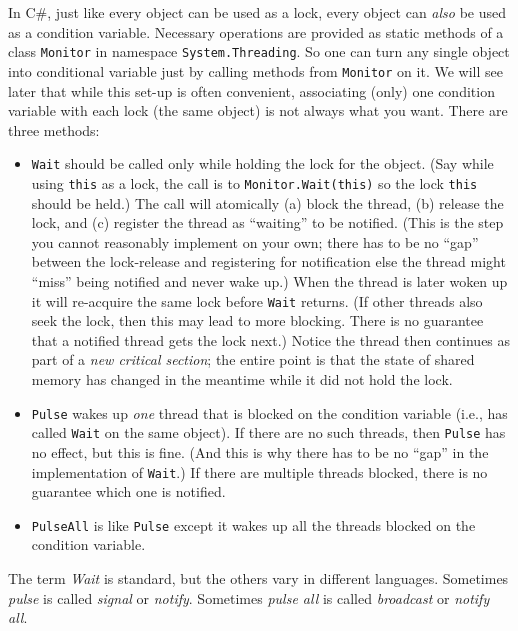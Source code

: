 \documentclass[10pt]{article}
\begin{document}
In C\#, just like every object can be used as a lock, every object 
can \emph{also} be used as a condition variable. Necessary operations are 
provided as static methods of a class {\tt Monitor} in namespace {\tt System.Threading}. 
So one can turn any single object into conditional variable just by 
calling methods from {\tt Monitor} on it. We will see later that while this
set-up is often convenient, associating (only) one condition variable
with each lock (the same object) is not always what you want.  There
are three methods:
\begin{itemize}
\item {\tt Wait} should be called only while holding the lock for the
  object.  (Say while using {\tt this} as a lock, the call is to 
  {\tt Monitor.Wait(this)} so the lock {\tt this} should be held.) 
  The call will atomically (a) block the thread,
  (b) release the lock, and (c) register the thread as
  ``waiting'' to be notified.  (This is the step you cannot reasonably
  implement on your own; there has to be no ``gap'' between the
  lock-release and registering for notification else the thread might ``miss''
  being notified and never wake up.)  When the thread is later woken
  up it will re-acquire the same lock before {\tt Wait} returns.  (If
  other threads also seek the lock, then this may lead to more
  blocking.  There is no guarantee that a notified thread gets the
  lock next.)  Notice the thread then continues as part of a \emph{new
    critical section}; the entire point is that the state of shared
  memory has changed in the meantime while it did not hold the lock.
\item {\tt Pulse} wakes up \emph{one} thread that is blocked on the
  condition variable (i.e., has called {\tt Wait} on the same object).
  If there are no such threads, then {\tt Pulse} has no effect, but
  this is fine.  (And this is why there has to be no ``gap'' in the
  implementation of {\tt Wait}.)  If there are multiple threads
  blocked, there is no guarantee which one is notified.
\item {\tt PulseAll} is like {\tt Pulse} except it wakes up all the
  threads blocked on the condition variable.
\end{itemize}
The term \emph{Wait} is standard, but the others vary in different
languages.  Sometimes \emph{pulse} is called \emph{signal} or
\emph{notify}.  Sometimes \emph{pulse all} is called \emph{broadcast}
or \emph{notify all}.
\end{document}
